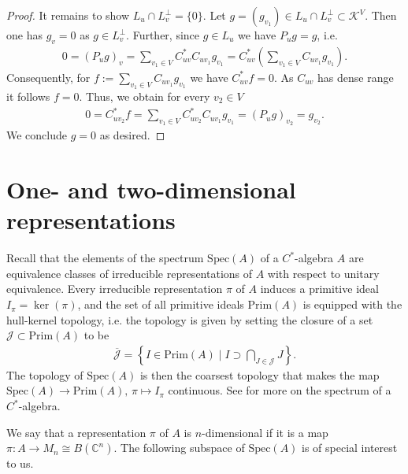 \documentclass[a4paper]{amsart}
\newcommand{\C}{\mathbb{C}}
\begin{document}
\begin{proof}
    It remains to show $L_u \cap L_v^\perp = \{0\}$. Let $g = (g_{v_1}) \in L_u \cap L_v^\perp \subset \mathcal{K}^V$. Then one has $g_v = 0$ as $g \in L_v^\perp$. Further, since $g \in L_u$ we have $P_u g = g$, i.e.
    \begin{align*}
        0 = (P_u g)_v = \sum_{v_1 \in V} C_{u v}^\ast C_{u v_1} g_{v_1} = C_{u v}^\ast \left( \sum_{v_1 \in V} C_{u v_1} g_{v_1} \right).
    \end{align*}
    Consequently, for $f := \sum_{v_1 \in V} C_{u v_1} g_{v_1}$ we have $C_{uv}^\ast f = 0$. As $C_{uv}$ has dense range it follows $f = 0$. Thus, we obtain for every $v_2 \in V$
    \begin{align*}
        0 = C_{u v_2}^\ast f = \sum_{v_1 \in V} C_{u v_2}^\ast C_{u v_1} g_{v_1} = (P_u g)_{v_2} = g_{v_2}.
    \end{align*}
    We conclude $g = 0$ as desired.
\end{proof}


\section{One- and two-dimensional representations}
\label{sec::one_and_two_dimensional_representations}

Recall that the elements of the spectrum $\mathrm{Spec}(A)$ of a $C^\ast$-algebra $A$ are equivalence classes of irreducible representations of $A$ with respect to unitary equivalence. Every irreducible representation $\pi$ of $A$ induces a primitive ideal $I_\pi = \ker(\pi)$, and the set of all primitive ideals $\mathrm{Prim}(A)$ is equipped with the hull-kernel topology, i.e. the topology is given by setting the closure of a set $\mathcal{J} \subset \mathrm{Prim}(A)$ to be
\begin{align*}
    \overline{\mathcal{J}} = \left\{I \in \mathrm{Prim}(A) \mid I \supset \bigcap_{J \in \mathcal{J}} J \right\}.
\end{align*}
The topology of $\mathrm{Spec}(A)$ is then the coarsest topology that makes the map $\mathrm{Spec}(A) \to \mathrm{Prim}(A), \, \pi \mapsto I_\pi$ continuous. See \cite[Section II.6.5]{blackadar_operator_2006} for more on the spectrum of a $C^\ast$-algebra.

We say that a representation $\pi$ of $A$ is $n$-dimensional if it is a map $\pi: A \to M_n \cong B(\C^n)$. The following subspace of $\mathrm{Spec}(A)$ is of special interest to us.
\end{document}

